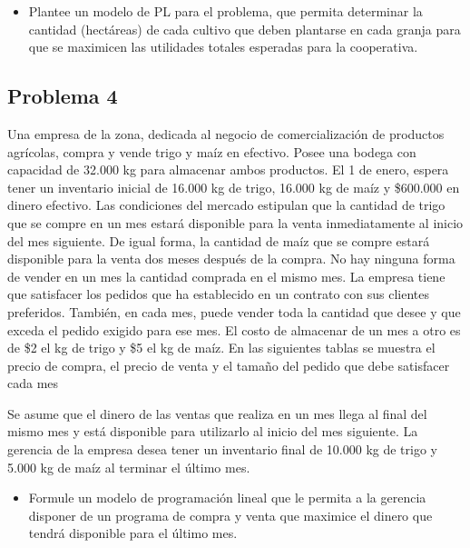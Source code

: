 \documentclass[letterpaper]{article}
\begin{document}
\begin{itemize}
\item Plantee un modelo de PL para el problema, que permita determinar la cantidad (hectáreas) de cada cultivo que deben plantarse en cada granja para que se maximicen las utilidades totales esperadas para la cooperativa.
\end{itemize}




\subsection*{Problema 4}
Una empresa de la zona, dedicada al negocio de comercialización de productos agrícolas, compra y vende trigo y maíz en efectivo. Posee una bodega con capacidad de 32.000 kg para almacenar ambos productos. El 1 de enero, espera tener un inventario inicial de 16.000 kg de trigo, 16.000 kg de maíz y \$600.000 en dinero efectivo. Las condiciones del mercado estipulan que la cantidad de trigo que se compre en un mes estará disponible para la venta inmediatamente al inicio del mes siguiente. De igual forma, la cantidad de maíz que se compre estará disponible para la venta dos meses después de la compra. No hay ninguna forma de vender en un mes la cantidad comprada en el mismo mes. La empresa tiene que satisfacer los pedidos que ha establecido en un contrato con sus clientes preferidos. También, en cada mes, puede vender toda la cantidad que desee y que exceda el pedido exigido para ese mes. El costo de almacenar de un mes a otro es de \$2 el kg de trigo y \$5 el kg de maíz. En las siguientes tablas se muestra el precio de compra, el precio de venta y el tamaño del pedido que debe satisfacer cada mes


Se asume que el dinero de las ventas que realiza en un mes llega al final del mismo mes y está disponible para utilizarlo al inicio del mes siguiente. La gerencia de la empresa desea tener un inventario final de 10.000 kg de trigo y 5.000 kg de maíz al terminar el último mes. 

\begin{itemize}
\item Formule un modelo de programación lineal que le permita a la gerencia disponer de un programa de compra y venta que maximice el dinero que tendrá disponible para el último mes.
\end{itemize}
\end{document}
